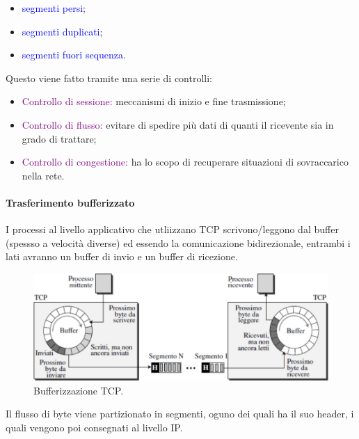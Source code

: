\begin{itemize}
\begin{itemize}
        \item \textcolor{blue}{segmenti persi};
        \item \textcolor{blue}{segmenti duplicati};
        \item \textcolor{blue}{segmenti fuori sequenza}.
    \end{itemize}
    Questo viene fatto tramite una serie di controlli:
    \begin{itemize}
        \item \textcolor{purple}{Controllo di sessione:} meccanismi di inizio e fine trasmissione;
        \item \textcolor{purple}{Controllo di flusso:} evitare di spedire più dati di quanti il ricevente sia in grado di trattare;
        \item \textcolor{purple}{Controllo di congestione:} ha lo scopo di recuperare situazioni di sovraccarico nella rete.
    \end{itemize}
    
\end{itemize}

\paragraph{Trasferimento bufferizzato}
I processi al livello applicativo che utliizzano TCP scrivono/leggono dal buffer (spessso a velocità diverse) ed essendo la comunicazione bidirezionale, entrambi i lati avranno un buffer di invio e un buffer di ricezione.
\begin{figure}[h]
    \centering
    \includegraphics[scale=0.48]{Immagini/BufferizzazioneTCP.png}
    \caption{Bufferizzazione TCP.}
\end{figure}

Il flusso di byte viene partizionato in segmenti, oguno dei quali ha il suo header, i quali vengono poi consegnati al livello IP.


